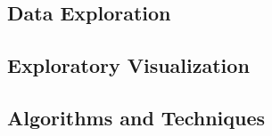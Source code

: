 \documentclass[12pt,a4paper]{article}
\begin{document}
\subsection*{Data Exploration}
%
\subsection*{Exploratory Visualization}
%
\subsection*{Algorithms and Techniques}
%
\end{document}
